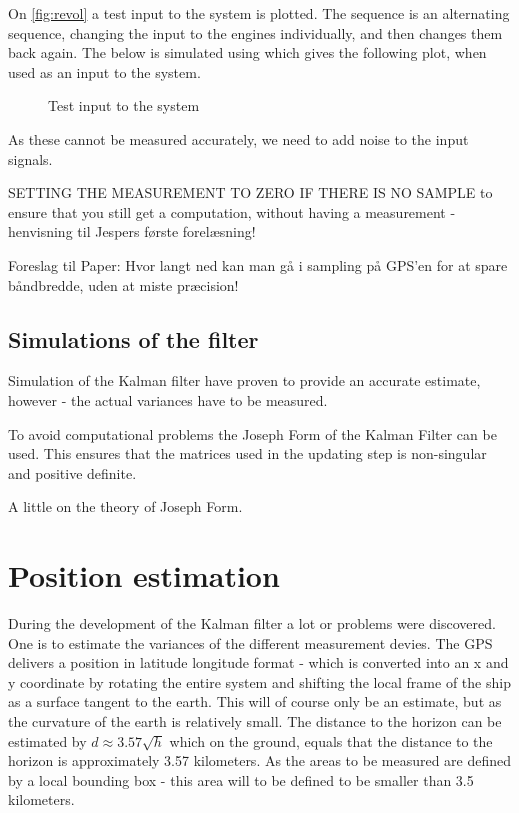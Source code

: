 On \vref{fig:revol} a test input to the system is plotted. The sequence is an alternating sequence, changing the input to the engines individually, and then changes them back again. The below is simulated using \MATLAB which gives the following plot, when used as an input to the system.  
\begin{figure}[htbp]
	\centering
	\caption{Test input to the system}
	\label{fig:revol}
\end{figure}

As these cannot be measured accurately, we need to add noise to the input signals.

SETTING THE MEASUREMENT TO ZERO IF THERE IS NO SAMPLE to ensure that you still get a computation, without having a measurement - henvisning til Jespers første forelæsning!

Foreslag til Paper: Hvor langt ned kan man gå i sampling på GPS'en for at spare båndbredde, uden at miste præcision!

\subsection{Simulations of the filter}
Simulation of the Kalman filter have proven to provide an accurate estimate, however - the actual variances have to be measured. 

To avoid computational problems the Joseph Form of the Kalman Filter can be used. This ensures that the matrices used in the updating step is non-singular and positive definite. 

A little on the theory of Joseph Form.

\section{Position estimation}
During the development of the Kalman filter a lot or problems were discovered. One is to estimate the variances of the different measurement devies. The GPS delivers a position in latitude longitude format - which is converted into an x and y coordinate by rotating the entire system and shifting the local frame of the ship as a surface tangent to the earth. This will of course only be an estimate, but as the curvature of the earth is relatively small. The distance to the horizon can be estimated by $d \approx 3.57\sqrt{h}$ which on the ground, equals that the distance to the horizon is approximately 3.57 kilometers. As the areas to be measured are defined by a local bounding box - this area will to be defined to be smaller than 3.5 kilometers.

